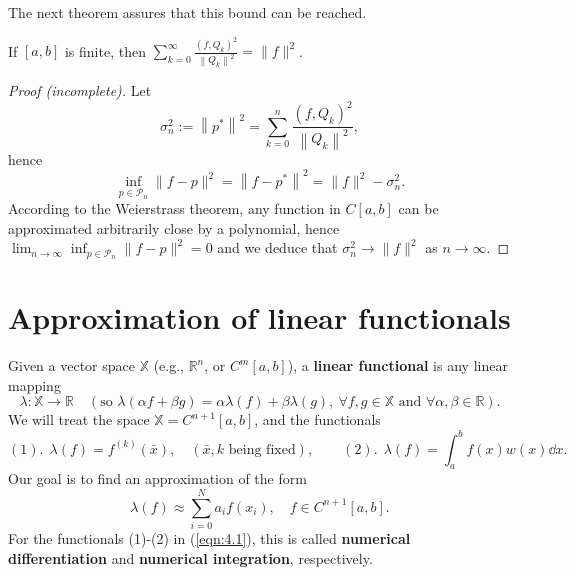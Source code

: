 \documentclass[a4paper]{article}
\begin{document}
The next theorem assures that this bound can be reached.

\begin{theorem}
    If $[a, b]$ is finite, then $ \displaystyle \sum_{k=0}^{\infty} \frac{\left(f, Q_k\right)^2}{\left\|Q_k\right\|^2}=\|f\|^2$.
\end{theorem}
\begin{proof}[Proof (incomplete)]
    Let
    \[
    \sigma_n^2:=\left\|p^*\right\|^2=\sum_{k=0}^n \frac{\left(f, Q_k\right)^2}{\left\|Q_k\right\|^2},
    \]
    hence
    \[
    \inf_{p \in \mathcal{P}_n}\|f-p\|^2=\left\|f-p^*\right\|^2=\|f\|^2-\sigma_n^2 .
    \]
    According to the Weierstrass theorem, any function in $C[a, b]$ can be approximated arbitrarily close by a polynomial, hence $\lim _{n \rightarrow \infty} \inf _{p \in \mathcal{P}_n}\|f-p\|^2=0$ and we deduce that $\sigma_n^2 \rightarrow\|f\|^2$ as $n \rightarrow \infty$.
\end{proof}

\section{Approximation of linear functionals}
Given a vector space $\mathbb{X}$ (e.g., $\mathbb{R}^n$, or $C^m[a, b]$), a \textbf{linear functional} is any linear mapping
\[
\lambda: \mathbb{X} \rightarrow \mathbb{R} \quad(\text {so } \lambda(\alpha f+\beta g)=\alpha \lambda(f)+\beta \lambda(g), \ \forall f, g \in \mathbb{X} \text { and } \forall \alpha, \beta \in \mathbb{R}) .
\]
We will treat the space $\mathbb{X}=C^{n+1}[a, b]$, and the functionals
\begin{equation}\label{eqn:4.1}
    (1).\ \ \lambda(f)=f^{(k)}(\bar{x}), \quad(\bar{x}, k \text{ being fixed}),\qquad
(2).\ \ \lambda(f)=\int_a^b f(x) w(x) \dd{x}.
\end{equation}
Our goal is to find an approximation of the form
\begin{equation}\label{eqn:4.2}
    \lambda(f) \approx \sum_{i=0}^N a_i f(x_i), \quad f \in C^{n+1}[a, b] .
\end{equation}
For the functionals (1)-(2) in (\ref{eqn:4.1}), this is called \textbf{numerical differentiation} and \textbf{numerical integration}, respectively.
\end{document}
